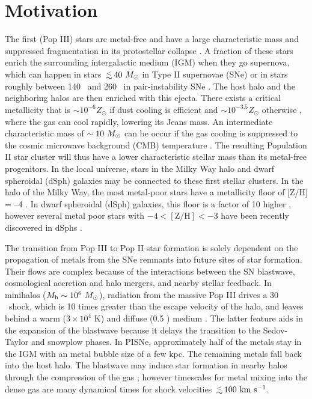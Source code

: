 \documentclass[apjl]{emulateapj}
\begin{document}

\section{Motivation}

The first (Pop III) stars are metal-free and have a large
characteristic mass and suppressed fragmentation in its protostellar
collapse \citep{Abel00, ABN02, Bromm02_P3, Yoshida03, OShea07a}.  A
fraction of these stars enrich the surrounding intergalactic medium
(IGM) when they go supernova, which can happen in stars $\lsim40~\Ms$
in Type II supernovae (SNe) or in stars roughly between 140 \Ms~and
260 \Ms~in pair-instability SNe \citep[PISNe;][]{2002ApJ...567..532H}.
The host halo and the neighboring halos are then enriched with this
ejecta.  There exists a critical metallicity that is $\sim 10^{-6}
Z_\odot$ if dust cooling is efficient \citep{Omukai05,
  Schneider06_Frag, clark08} and $\sim 10^{-3.5} Z_\odot$ otherwise
\citep{Bromm01, 2009ApJ...691..441S}, where the gas can cool rapidly,
lowering its Jeans mass.  An intermediate characteristic mass of
$\sim10~\Ms$ can be occur if the gas cooling is suppressed to the
cosmic microwave background (CMB) temperature \citep{Larson98,
  Tumlinson07_IMF, 2009ApJ...691..441S}.  The resulting Population II
star cluster will thus have a lower characteristic stellar mass than
its metal-free progenitors.  In the local universe, stars in the Milky
Way halo and dwarf spheroidal (dSph) galaxies may be connected to
these first stellar clusters.  In the halo of the Milky Way, the most
metal-poor stars have a metallicity floor of [Z/H] = --4
\citep{Beers05}.  In dwarf spheroidal (dSph) galaxies, this floor is a
factor of 10 higher \citep{Tolstoy04, Helmi06}, however several metal
poor stars with $-4 < [\mathrm{Z/H}] < -3$ have been recently
discovered in dSphs \citep{Tafelmeyer10, Frebel10_Obs}.

The transition from Pop III to Pop II star formation is solely
dependent on the propagation of metals from the SNe remnants into
future sites of star formation.  Their flows are complex because of
the interactions between the SN blastwave, cosmological accretion and
halo mergers, and nearby stellar feedback.  In minihalos ($M_{\rm h}
\sim 10^6~\Ms$), radiation from the massive Pop III drives a 30
\kms~shock, which is 10 times greater than the escape velocity of the
halo, and leaves behind a warm ($3 \times 10^4$ K) and diffuse (0.5
\cubecm) medium \citep{Kitayama04, Whalen04, Abel07}.  The latter
feature aids in the expansion of the blastwave because it delays the
transition to the Sedov-Taylor and snowplow phases.  In PISNe,
approximately half of the metals stay in the IGM with an metal bubble
size of a few kpc.  The remaining metals fall back into the host halo.
The blastwave may induce star formation in nearby halos through the
compression of the gas \citep{Ferrara98}; however timescales for metal
mixing into the dense gas are many dynamical times \citep{Cen08} for
shock velocities $\lsim 100~\kms$.
\end{document}
